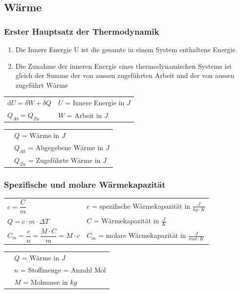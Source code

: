 	\subsection{Wärme}
		\begin{minipage}[t]{18cm}
			\subsubsection{Erster Hauptsatz der Thermodynamik}
				\begin{enumerate}
					\item  Die Innere Energie U ist die gesamte in einem System enthaltene Energie.
					\item Die Zunahme der inneren Energie eines thermodynamischen Systems ist gleich der Summe der von aussen zugeführten Arbeit und der von aussen zugeführt Wärme
				\end{enumerate}
				\renewcommand{\arraystretch}{2.5}
				\begin{tabular}{ p{5cm} | p{7cm}}
					$\mathrm{d} U = \delta W + \delta Q$	&	$U$ = Innere Energie in $J$\\
					$Q_{Ab} = Q_{Zu}$	& $W$ = Arbeit in $J$\\
				\end{tabular}
				\renewcommand{\arraystretch}{1.5}
				\newline
				\begin{tabular}{ p{5cm} | p{7cm} }
					& $Q$ = Wärme in $J$\\
					& $Q_{Ab}$ = Abgegebene Wärme in $J$\\
					& $Q_{Zu}$ = Zugeführte Wärme in $J$\\
				\end{tabular} 
				\renewcommand{\arraystretch}{1}
		\end{minipage}
		\newline
		\newline
		\newline
		\begin{minipage}[t]{18cm}
			\subsubsection{Spezifische und molare Wärmekapazität}
				\renewcommand{\arraystretch}{2.5}
				\begin{tabular}{ p{5cm} | p{7cm}}
					$c = \dfrac{C}{m}$	&	$c$ = spezifische Wärmekapazität in $\frac{J}{kg \cdot K}$\\
					$Q = c \cdot m \cdot \Delta T$	&	$C$ = Wärmekapazität in $\frac{J}{K}$\\
					$C_m = \dfrac{c}{n} = \dfrac{M \cdot C}{m} = M \cdot c$ & $C_m$ = molare Wärmekapazität in $\frac{J}{mol \cdot K}$
				\end{tabular}
				\renewcommand{\arraystretch}{1.5}
				\newline
				\begin{tabular}{ p{5cm} | p{7cm} }
					& $Q$ = Wärme in $J$\\
					& $n$ = Stoffmenge = Anzahl Mol\\
					& $M$ = Molmasse in $kg$\\
				\end{tabular} 
				\renewcommand{\arraystretch}{1}
		\end{minipage}
